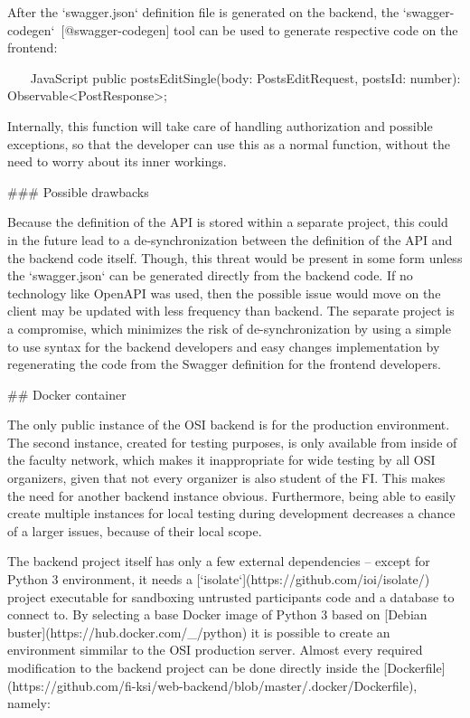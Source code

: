 \documentclass[
  digital, %
  oneside, %
  lof,     %
  lot,     %
]{fithesis4}
\begin{document}
{\mdstart

After the `swagger.json` definition file is generated on the backend, the `swagger-codegen`~[@swagger-codegen] tool can be used to generate respective code on the frontend:

~~~ JavaScript
public postsEditSingle(body: PostsEditRequest, postsId: number): Observable<PostResponse>;
~~~

Internally, this function will take care of handling authorization and possible exceptions, so that the developer can use this as a normal function, without the need to worry about its inner workings.

### Possible drawbacks

Because the definition of the API is stored within a separate project, this could in the future lead to a de-synchronization between the definition of the API and the backend code itself. Though, this threat would be present in some form unless the `swagger.json` can be generated directly from the backend code. If no technology like OpenAPI was used, then the possible issue would move on the client may be updated with less frequency than backend. The separate project is a compromise, which minimizes the risk of de-synchronization by using a simple to use syntax for the backend developers and easy changes implementation by regenerating the code from the Swagger definition for the frontend developers.

## Docker container

The only public instance of the OSI backend is for the production environment. The second instance, created for testing purposes, is only available from inside of the faculty network, which makes it inappropriate for wide testing by all OSI organizers, given that not every organizer is also student of the FI. This makes the need for another backend instance obvious. Furthermore, being able to easily create multiple instances for local testing during development decreases a chance of a larger issues, because of their local scope.

The backend project itself has only a few external dependencies -- except for Python 3 environment, it needs a [`isolate`](https://github.com/ioi/isolate/) project executable for sandboxing untrusted participants code and a database to connect to. By selecting a base Docker image of Python 3 based on [Debian buster](https://hub.docker.com/_/python) it is possible to create an environment simmilar to the OSI production server. Almost every required modification to the backend project can be done directly inside the [Dockerfile](https://github.com/fi-ksi/web-backend/blob/master/.docker/Dockerfile), namely:

}
\end{document}
